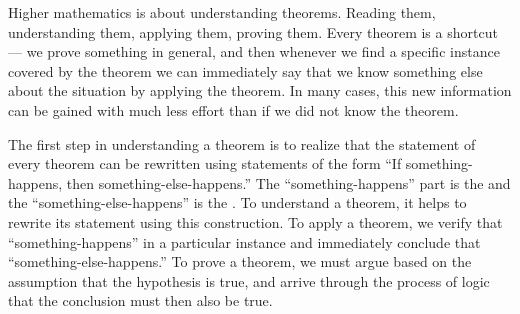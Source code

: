 Higher mathematics is about understanding theorems.  Reading them, understanding them,  applying them, proving them.  Every theorem is a shortcut --- we prove something in general, and then whenever we find a specific instance covered by the theorem we can immediately say that we know something else about the situation by applying the theorem.  In many cases, this new information can be gained with much less effort than if we did not know the theorem.\par
%
The first step in understanding a theorem is to realize that the statement of every theorem can be rewritten using statements of the form ``If something-happens, then something-else-happens.''  The ``something-happens'' part is the  and the ``something-else-happens'' is the .  To understand a theorem, it helps to rewrite its statement using this construction.  To apply a theorem, we verify that ``something-happens'' in a particular instance and immediately conclude that ``something-else-happens.''  To prove a theorem, we must argue based on the assumption that the hypothesis is true, and arrive through the process of logic that the conclusion must then also be true.
